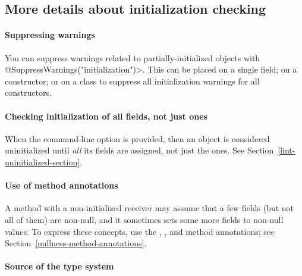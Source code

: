 \subsection{More details about initialization checking\label{initialization-checking}}


\paragraph{Suppressing warnings\label{initialization-checking-suppressing-warnings}}

\begin{sloppypar}
You can suppress warnings related to partially-initialized objects with
\<@SuppressWarnings("initialization")>.
This can be placed on a single field; on a constructor; or on a class to
suppress all initialization warnings for all constructors.
\end{sloppypar}

\paragraph{Checking initialization of all fields, not just  ones\label{initialization-checking-all-fields}}

When the  command-line option is provided, then
an object is considered uninitialized until \emph{all} its fields are assigned, not
just the  ones.  See Section~\ref{lint-uninitialized-section}.


\paragraph{Use of method annotations\label{initialization-checking-method-annotations}}

A method with a non-initialized receiver may assume that a few fields (but not all
of them) are non-null, and it sometimes sets some more fields to non-null
values.  To express these concepts, use the
,
, and
 method annotations;
see Section~\ref{nullness-method-annotations}.


\paragraph{Source of the type system\label{initialization-checking-type-system}}

